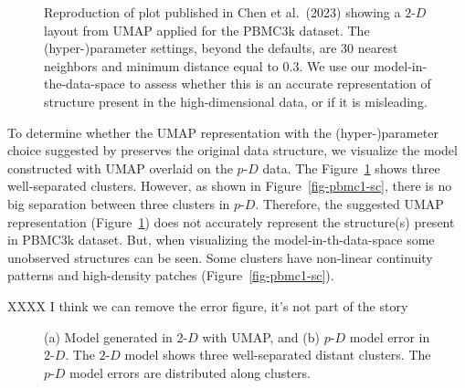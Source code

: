 \documentclass[
  12pt]{article}
\newcommand\pD{$p\text{-}D$}
\begin{document}
\begin{figure}[H]


\caption{\label{fig-umap-author}Reproduction of plot published in Chen
et al.~(2023) showing a \(2\text{-}D\) layout from UMAP applied for the
PBMC3k dataset. The (hyper-)parameter settings, beyond the defaults, are
30 nearest neighbors and minimum distance equal to 0.3. We use our
model-in-the-data-space to assess whether this is an accurate
representation of structure present in the high-dimensional data, or if
it is misleading.}

\end{figure}%

To determine whether the UMAP representation with the (hyper-)parameter
choice suggested by \citet{chen2023} preserves the original data
structure, we visualize the model constructed with UMAP overlaid on the
\pD{} data. The Figure~\ref{fig-umap-author} shows three well-separated
clusters. However, as shown in Figure~\ref{fig-pbmc1-sc}, there is no
big separation between three clusters in \pD{}. Therefore, the suggested
UMAP representation (Figure~\ref{fig-umap-author}) does not accurately
represent the structure(s) present in PBMC3k dataset. But, when
visualizing the model-in-th-data-space some unobserved structures can be
seen. Some clusters have non-linear continuity patterns and high-density
patches (Figure~\ref{fig-pbmc1-sc}).

XXXX I think we can remove the error figure, it's not part of the story

\begin{figure}[H]


\caption{\label{fig-model-pbmc-author}(a) Model generated in
\(2\text{-}D\) with UMAP, and (b) \(p\text{-}D\) model error in
\(2\text{-}D\). The \(2\text{-}D\) model shows three well-separated
distant clusters. The \(p\text{-}D\) model errors are distributed along
clusters.}

\end{figure}%
\end{document}
